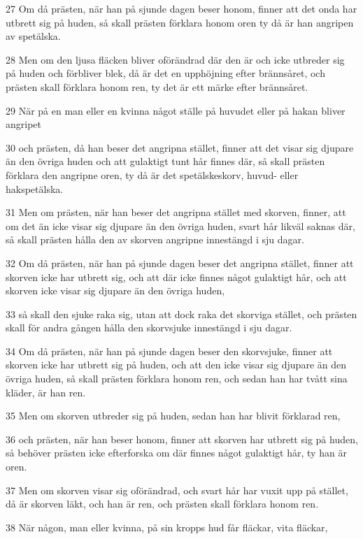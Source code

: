 \par 27 Om då prästen, när han på sjunde dagen beser honom, finner att det onda har utbrett sig på huden, så skall prästen förklara honom oren ty då är han angripen av spetälska.
\par 28 Men om den ljusa fläcken bliver oförändrad där den är och icke utbreder sig på huden och förbliver blek, då är det en upphöjning efter brännsåret, och prästen skall förklara honom ren, ty det är ett märke efter brännsåret.
\par 29 När på en man eller en kvinna något ställe på huvudet eller på hakan bliver angripet
\par 30 och prästen, då han beser det angripna stället, finner att det visar sig djupare än den övriga huden och att gulaktigt tunt hår finnes där, så skall prästen förklara den angripne oren, ty då är det spetälskeskorv, huvud- eller hakspetälska.
\par 31 Men om prästen, när han beser det angripna stället med skorven, finner, att om det än icke visar sig djupare än den övriga huden, svart hår likväl saknas där, så skall prästen hålla den av skorven angripne innestängd i sju dagar.
\par 32 Om då prästen, när han på sjunde dagen beser det angripna stället, finner att skorven icke har utbrett sig, och att där icke finnes något gulaktigt hår, och att skorven icke visar sig djupare än den övriga huden,
\par 33 så skall den sjuke raka sig, utan att dock raka det skorviga stället, och prästen skall för andra gången hålla den skorvsjuke innestängd i sju dagar.
\par 34 Om då prästen, när han på sjunde dagen beser den skorvsjuke, finner att skorven icke har utbrett sig på huden, och att den icke visar sig djupare än den övriga huden, så skall prästen förklara honom ren, och sedan han har tvått sina kläder, är han ren.
\par 35 Men om skorven utbreder sig på huden, sedan han har blivit förklarad ren,
\par 36 och prästen, när han beser honom, finner att skorven har utbrett sig på huden, så behöver prästen icke efterforska om där finnes något gulaktigt hår, ty han är oren.
\par 37 Men om skorven visar sig oförändrad, och svart hår har vuxit upp på stället, då är skorven läkt, och han är ren, och prästen skall förklara honom ren.
\par 38 När någon, man eller kvinna, på sin kropps hud får fläckar, vita fläckar,
